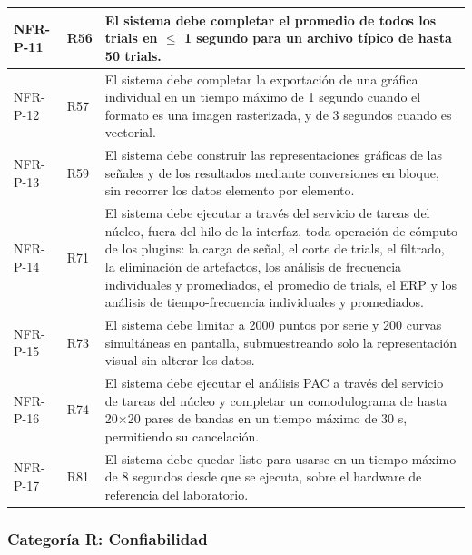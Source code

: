 \documentclass[12pt, letterpaper]{article}
\begin{document}
\begin{longtable}{|p{2.5cm}|p{2.5cm}|p{10.1cm}|}
\hline
NFR-P-11 & R56 & El sistema debe completar el promedio de todos los trials en $\leq$ 1 segundo para un archivo típico de hasta 50 trials. \\
\hline
NFR-P-12 & R57 & El sistema debe completar la exportación de una gráfica individual en un tiempo máximo de 1 segundo cuando el formato es una imagen rasterizada, y de 3 segundos cuando es vectorial. \\
\hline
NFR-P-13 & R59 & El sistema debe construir las representaciones gráficas de las señales y de los resultados mediante conversiones en bloque, sin recorrer los datos elemento por elemento. \\
\hline
NFR-P-14 & R71 & El sistema debe ejecutar a través del servicio de tareas del núcleo, fuera del hilo de la interfaz, toda operación de cómputo de los plugins: la carga de señal, el corte de trials, el filtrado, la eliminación de artefactos, los análisis de frecuencia individuales y promediados, el promedio de trials, el ERP y los análisis de tiempo-frecuencia individuales y promediados. \\
\hline
NFR-P-15 & R73 & El sistema debe limitar a 2000 puntos por serie y 200 curvas simultáneas en pantalla, submuestreando solo la representación visual sin alterar los datos. \\
\hline
NFR-P-16 & R74 & El sistema debe ejecutar el análisis PAC a través del servicio de tareas del núcleo y completar un comodulograma de hasta 20×20 pares de bandas en un tiempo máximo de 30 s, permitiendo su cancelación. \\
\hline
NFR-P-17 & R81 & El sistema debe quedar listo para usarse en un tiempo máximo de 8 segundos desde que se ejecuta, sobre el hardware de referencia del laboratorio. \\

\end{longtable}
\vspace{-0.5em}
\label{tab:nfr-p}

\subsubsection{Categoría R: Confiabilidad}
\end{document}
